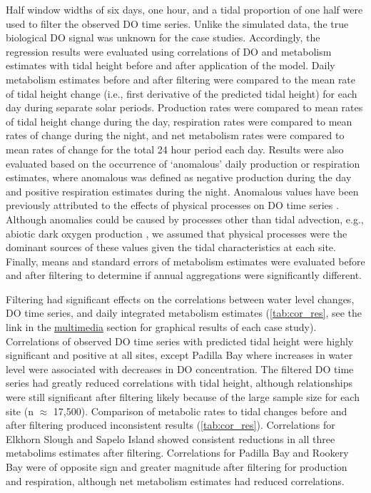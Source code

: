 \documentclass[letterpaper,12pt,oneside]{article}\usepackage[]{graphicx}\usepackage[]{color}
\begin{document}
Half window widths of six days, one hour, and a tidal proportion of one half were used to filter the observed \ac{DO} time series.  Unlike the simulated data, the true biological \ac{DO} signal was unknown for the case studies.  Accordingly, the regression results were evaluated  using correlations of \ac{DO} and metabolism estimates with tidal height before and after application of the model.  Daily metabolism estimates before and after filtering were compared to the mean rate of tidal height change (i.e., first derivative of the predicted tidal height) for each day during separate solar periods.  Production rates were compared to mean rates of tidal height change during the day, respiration rates were compared to mean rates of change during the night, and net metabolism rates were compared to mean rates of change for the total 24 hour period each day.  Results were also evaluated based on the occurrence of `anomalous' daily production or respiration estimates, where anomalous was defined as negative production during the day and positive respiration estimates during the night.  Anomalous values have been previously attributed to the effects of physical processes on \ac{DO} time series \citep{Caffrey03}. Although anomalies could be caused by processes other than tidal advection, e.g., abiotic dark oxygen production \citep{Pamatmat97}, we assumed that physical processes were the dominant sources of these values given the tidal characteristics at each site.  Finally, means and standard errors of metabolism estimates were evaluated before and after filtering to determine if annual aggregations were significantly different.   

Filtering had significant effects on the correlations between water level changes, \ac{DO} time series, and daily integrated metabolism estimates (\cref{tab:cor_res}, see the link in the \hyperref[multi]{multimedia} section for graphical results of each case study).  Correlations of observed \ac{DO} time series with predicted tidal height were highly significant and positive at all sites, except Padilla Bay where increases in water level were associated with decreases in \ac{DO}  concentration.  The filtered \ac{DO} time series had greatly reduced correlations with tidal height, although relationships were still significant after filtering likely because of the large sample size for each site (n $\approx$ 17,500). Comparison of metabolic rates to tidal changes before and after filtering produced inconsistent results (\cref{tab:cor_res}).  Correlations for Elkhorn Slough and Sapelo Island showed consistent reductions in all three metabolims estimates after filtering.  Correlations for Padilla Bay and Rookery Bay were of opposite sign and greater magnitude after filtering for production and respiration, although net metabolism estimates had reduced correlations.  
\end{document}
